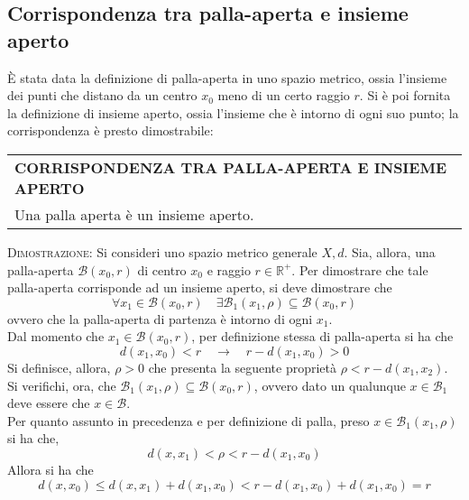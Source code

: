 \documentclass[a4paper]{extarticle}
\renewcommand\arraystretch{}
\begin{document}
\vspace{1em}
\noindent
\subsection{Corrispondenza tra palla-aperta e insieme aperto}
È stata data la definizione di palla-aperta in uno spazio metrico, ossia l'insieme dei punti che distano da un centro $x_0$ meno di un certo raggio $r$. Si è poi fornita la definizione di insieme aperto, ossia l'insieme che è intorno di ogni suo punto; la corrispondenza è presto dimostrabile:

\vspace{1em}
\setlength{\tabcolsep}{14pt}
\renewcommand{\arraystretch}{2}
\noindent
\begin{tabularx}{\textwidth}{@{}|P|@{}}
    \hline
    {\textbf{CORRISPONDENZA TRA PALLA-APERTA E INSIEME APERTO}}\\
    \parbox{\linewidth}{Una palla aperta è un insieme aperto.
    \vspace{3mm}}\\
    \hline
\end{tabularx}

\vspace{2em}
\noindent
\normalfont \normalsize
\textsc{Dimostrazione}: Si consideri uno spazio metrico generale $X,d$. Sia, allora, una palla-aperta $\mathcal{B}(x_0,r)$ di centro $x_0$ e raggio $r \in \mathbb{R}^+$. Per dimostrare che tale palla-aperta corrisponde ad un insieme aperto, si deve dimostrare che 
\[\forall x_1 \in \mathcal{B}(x_0,r) \hspace{1em} \exists \mathcal{B}_1(x_1,\rho) \subseteq \mathcal{B}(x_0,r)\]
ovvero che la palla-aperta di partenza è intorno di ogni $x_1$.\\
Dal momento che $ x_1 \in \mathcal{B}(x_0,r)$, per definizione stessa di palla-aperta si ha che
\[d(x_1,x_0) < r \hspace{1em} \rightarrow \hspace{1em} r-d(x_1,x_0) > 0\]
Si definisce, allora, $\rho > 0$ che presenta la seguente proprietà $\rho < r - d(x_1,x_2)$. Si verifichi, ora, che $\mathcal{B}_1(x_1,\rho) \subseteq \mathcal{B}(x_0,r)$, ovvero dato un qualunque $x \in \mathcal{B}_1$ deve essere che $x \in \mathcal{B}$.\\
Per quanto assunto in precedenza e per definizione di palla, preso $x \in \mathcal{B}_1(x_1,\rho)$ si ha che,
\[d(x,x_1) < \rho < r-d(x_1,x_0)\]
Allora si ha che
\[d(x,x_0) \leq d(x,x_1) + d(x_1,x_0) < r - d(x_1,x_0)+d(x_1,x_0) = r\]
\end{document}
